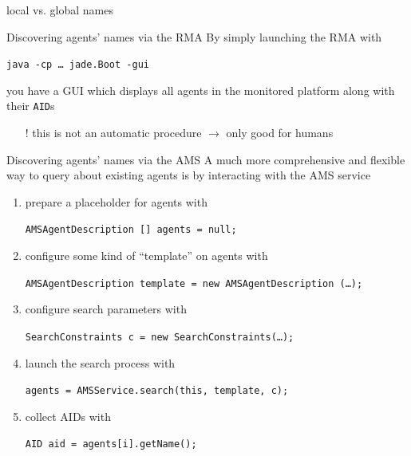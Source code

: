 \documentclass{beamer}\mode<presentation>{\usetheme{AMSCesenaPurpleAndGold}}
\begin{document}
\begin{frame}[c,allowframebreaks]
\begin{block}{\jade{} local vs. global names}
\begin{description}
        \end{description}
    \end{block}
    \begin{block}{Discovering agents' names via the RMA}
        By simply launching the RMA with
        \begin{center}
            \texttt{java -cp \ldots{} jade.Boot \alert{-gui}}
        \end{center}
        you have a GUI which displays all agents in the monitored \jade{} platform along with their \texttt{AID}s
        \begin{itemize}
        	\item[!] this is not an automatic procedure $\rightarrow$ only good for humans
        \end{itemize}
    \end{block}
    \begin{block}{Discovering agents' names via the AMS}
        A much more comprehensive and flexible way to query \jade{} about existing agents is by interacting with the AMS service
        \begin{enumerate}
            \item prepare a placeholder for agents with\\\begin{small}\texttt{\alert{AMSAgentDescription} [] agents = null;}\end{small}
            \item configure some kind of ``template'' on agents with\\\begin{small}\texttt{AMSAgentDescription template = new AMSAgentDescription (\ldots);}\end{small}
            \item configure search parameters with\\\begin{small}\texttt{\alert{SearchConstraints} c = new SearchConstraints(\ldots);}\end{small}
            \item launch the search process with\\\begin{small}\texttt{agents = \alert{AMSService.search}(this, template, c);}\end{small}
            \item collect AIDs with\\\begin{small}\texttt{AID aid = agents[i].\alert{getName()};}\end{small}
        \end{enumerate}
    \end{block}
\end{frame}
\end{document}
